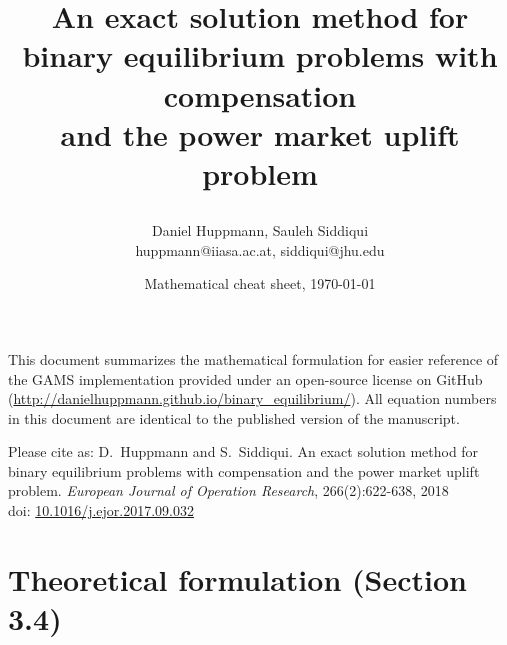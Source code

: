 \documentclass[9pt,a4paper]{article}
\title{\Large An exact solution method for \\ binary equilibrium problems with compensation \\ 
	and the power market uplift problem
\author{\normalsize Daniel Huppmann, Sauleh Siddiqui \\
	\small huppmann@iiasa.ac.at, siddiqui@jhu.edu
}
\date{\normalsize Mathematical cheat sheet, \today}
}
\begin{document}
\maketitle

This document summarizes the mathematical formulation 
for easier reference of the GAMS implementation 
provided under an open-source license on GitHub
(\url{http://danielhuppmann.github.io/binary_equilibrium/}). 
All equation numbers in this document are identical 
to the published version of the manuscript.

\vspace{4 pt} \noindent
Please cite as: 
\newline 
D.~Huppmann and S.~Siddiqui. 
An exact solution method for binary equilibrium problems with compensation
and the power market uplift problem. 
\newline
\emph{European Journal of Operation Research}, 266(2):622-638, 2018 \\ 
doi: \href{https://dx.doi.org/10.1016/j.ejor.2017.09.032}{10.1016/j.ejor.2017.09.032}

\section*{Theoretical formulation (Section 3.4)}
\end{document}
